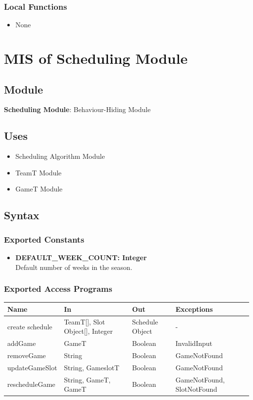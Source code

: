 \documentclass[12pt, titlepage]{article}
\begin{document}
\subsubsection{Local Functions}
\begin{itemize}
  \item None
\end{itemize}

\section{MIS of Scheduling Module} \label{SchedulingModule}

\subsection{Module}
\textbf{Scheduling Module}: Behaviour-Hiding Module

\subsection{Uses}
\begin{itemize}
    \item Scheduling Algorithm Module
    \item TeamT Module
    \item GameT Module
\end{itemize}

\subsection{Syntax}

\subsubsection{Exported Constants}

\begin{itemize}
    \item \textbf{DEFAULT\_WEEK\_COUNT: Integer} \\ Default number of weeks in the season.
\end{itemize}

\subsubsection{Exported Access Programs}
\begin{center}
  \begin{tabular}{|p{4cm}| p{4cm}| p{4cm} | p{3cm}|}
  \hline
  \textbf{Name} & \textbf{In} & \textbf{Out} & \textbf{Exceptions} \\
  \hline
  create schedule & TeamT[], Slot Object[], Integer & Schedule Object & - \\
  addGame & GameT & Boolean & InvalidInput \\
  removeGame & String & Boolean & GameNotFound \\
  updateGameSlot & String, GameslotT & Boolean & GameNotFound \\
  rescheduleGame & String, GameT, GameT & Boolean & GameNotFound, SlotNotFound \\
  \hline
  \end{tabular}
\end{center}
\end{document}
